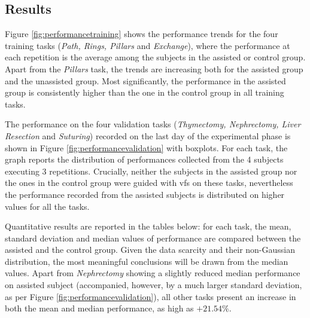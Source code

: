 \documentclass{article}
\begin{document}
\begin{multicols}{2}
\section{Results}
Figure \ref{fig:performancetraining} shows the performance trends for the four training tasks (\textit{Path, Rings, Pillars} and \textit{Exchange}), where the performance at each repetition is the average among the subjects in the assisted or control group. Apart from the \textit{Pillars} task, the trends are increasing both for the assisted group and the unassisted group. Most significantly, the performance in the assisted group is consistently higher than the one in the control group in all training tasks. 

The performance on the four validation tasks (\textit{Thymectomy, Nephrectomy, Liver Resection} and \textit{Suturing}) recorded on the last day of the experimental phase is shown in Figure \ref{fig:performancevalidation} with boxplots. For each task, the graph reports the distribution of performances collected from the 4 subjects executing 3 repetitions. Crucially, neither the subjects in the assisted group nor the ones in the control group were guided with \acp{vf} on these tasks, nevertheless the performance recorded from the assisted subjects is distributed on higher values for all the tasks. 

Quantitative results are reported in the tables below: for each task, the mean, standard deviation and median values of performance are compared between the assisted and the control group. Given the data scarcity and their non-Gaussian distribution, the most meaningful conclusions will be drawn from the median values. Apart from \textit{Nephrectomy} showing a slightly reduced median performance on assisted subject (accompanied, however, by a much larger standard deviation, as per Figure \ref{fig:performancevalidation}), all other tasks present an increase in both the mean and median performance, as high as $+21.54\%$.


\end{multicols}
\end{document}
